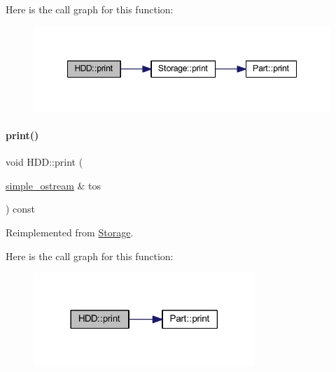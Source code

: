 Here is the call graph for this function\+:
\nopagebreak
\begin{figure}[H]
\begin{center}
\leavevmode
\includegraphics[width=348pt]{class_h_d_d_aca2c2583fa3304917905cd9185b64539_cgraph}
\end{center}
\end{figure}
\mbox{\label{class_h_d_d_a0e48767713740f3ec7dafd907d3570b1}} 
\paragraph{\texorpdfstring{print()}{print()}\hspace{0.1cm}{\footnotesize\ttfamily [3/4]}}
{\footnotesize\ttfamily void H\+D\+D\+::print (\begin{DoxyParamCaption}\item[{\mbox{\hyperlink{structsimple__ostream}{simple\+\_\+ostream}} \&}]{tos }\end{DoxyParamCaption}) const\hspace{0.3cm}{\ttfamily [virtual]}}



Reimplemented from \mbox{\hyperlink{class_storage_a53fc5b4814df41517b9f2be8dcef605e}{Storage}}.

Here is the call graph for this function\+:
\nopagebreak
\begin{figure}[H]
\begin{center}
\leavevmode
\includegraphics[width=237pt]{class_h_d_d_a0e48767713740f3ec7dafd907d3570b1_cgraph}
\end{center}
\end{figure}
\mbox{\label{class_h_d_d_a557271f835f56a25fe5c264019f20bb2}} 
